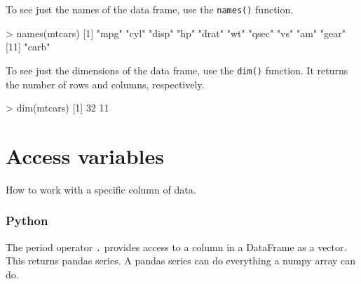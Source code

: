 \documentclass[
]{book}
\newenvironment{Shaded}{\begin{snugshade}}{\end{snugshade}}
\newcommand{\DecValTok}[1]{\textcolor[rgb]{0.00,0.00,0.81}{#1}}
\newcommand{\FunctionTok}[1]{\textcolor[rgb]{0.00,0.00,0.00}{#1}}
\newcommand{\NormalTok}[1]{#1}
\newcommand{\SpecialCharTok}[1]{\textcolor[rgb]{0.00,0.00,0.00}{#1}}
\newcommand{\StringTok}[1]{\textcolor[rgb]{0.31,0.60,0.02}{#1}}
\begin{document}
To see just the names of the data frame, use the \texttt{names()} function.

\begin{Shaded}
\begin{Highlighting}[]
\SpecialCharTok{\textgreater{}} \FunctionTok{names}\NormalTok{(mtcars)}
\NormalTok{ [}\DecValTok{1}\NormalTok{] }\StringTok{"mpg"}  \StringTok{"cyl"}  \StringTok{"disp"} \StringTok{"hp"}   \StringTok{"drat"} \StringTok{"wt"}   \StringTok{"qsec"} \StringTok{"vs"}   \StringTok{"am"}   \StringTok{"gear"}
\NormalTok{[}\DecValTok{11}\NormalTok{] }\StringTok{"carb"}
\end{Highlighting}
\end{Shaded}

To see just the dimensions of the data frame, use the \texttt{dim()} function. It returns the number of rows and columns, respectively.

\begin{Shaded}
\begin{Highlighting}[]
\SpecialCharTok{\textgreater{}} \FunctionTok{dim}\NormalTok{(mtcars)}
\NormalTok{[}\DecValTok{1}\NormalTok{] }\DecValTok{32} \DecValTok{11}
\end{Highlighting}
\end{Shaded}

\hypertarget{access-variables}{%
\section{Access variables}\label{access-variables}}

How to work with a specific column of data.

\hypertarget{python-15}{%
\subsubsection*{Python}\label{python-15}}

The period operator \texttt{.} provides access to a column in a DataFrame as a vector. This returns pandas series. A pandas series can do everything a numpy array can do.
\end{document}
